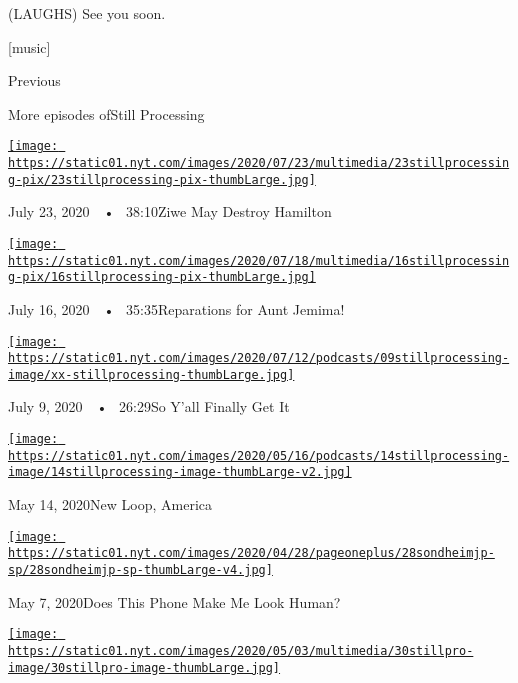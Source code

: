 (LAUGHS) See you soon.

{[}music{]}

Previous

More episodes ofStill Processing

\href{https://www.nytimes.com/2020/07/23/podcasts/hamilton-ziwe-discomfort.html?action=click\&module=audio-series-bar\&region=header\&pgtype=Article}{\texttt{[image: https://static01.nyt.com/images/2020/07/23/multimedia/23stillprocessing-pix/23stillprocessing-pix-thumbLarge.jpg]}}

July 23, 2020~~•~ 38:10Ziwe May Destroy Hamilton

\href{https://www.nytimes.com/2020/07/16/podcasts/reparations-for-aunt-jemima.html?action=click\&module=audio-series-bar\&region=header\&pgtype=Article}{\texttt{[image: https://static01.nyt.com/images/2020/07/18/multimedia/16stillprocessing-pix/16stillprocessing-pix-thumbLarge.jpg]}}

July 16, 2020~~•~ 35:35Reparations for Aunt Jemima!

\href{https://www.nytimes.com/2020/07/09/podcasts/still-processing-black-lives-matter.html?action=click\&module=audio-series-bar\&region=header\&pgtype=Article}{\texttt{[image: https://static01.nyt.com/images/2020/07/12/podcasts/09stillprocessing-image/xx-stillprocessing-thumbLarge.jpg]}}

July 9, 2020~~•~ 26:29So Y'all Finally Get It

\href{https://www.nytimes.com/2020/05/14/podcasts/still-processing-westworld-hollywood-utopia-dystopia.html?action=click\&module=audio-series-bar\&region=header\&pgtype=Article}{\texttt{[image: https://static01.nyt.com/images/2020/05/16/podcasts/14stillprocessing-image/14stillprocessing-image-thumbLarge-v2.jpg]}}

May 14, 2020New Loop, America

\href{https://www.nytimes.com/2020/05/07/podcasts/still-processing-internet-vulnerability-sondheim-parks-recreation.html?action=click\&module=audio-series-bar\&region=header\&pgtype=Article}{\texttt{[image: https://static01.nyt.com/images/2020/04/28/pageoneplus/28sondheimjp-sp/28sondheimjp-sp-thumbLarge-v4.jpg]}}

May 7, 2020Does This Phone Make Me Look Human?

\href{https://www.nytimes.com/2020/04/30/podcasts/still-processing-fiona-apple-fetch-bolt-cutters.html?action=click\&module=audio-series-bar\&region=header\&pgtype=Article}{\texttt{[image: https://static01.nyt.com/images/2020/05/03/multimedia/30stillpro-image/30stillpro-image-thumbLarge.jpg]}}

